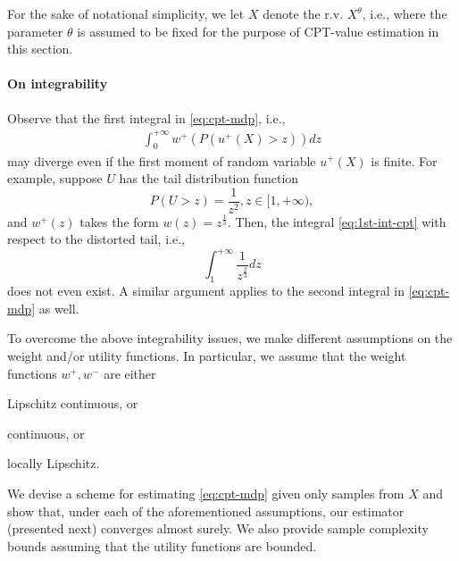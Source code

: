 For the sake of notational simplicity, we let $X$ denote the r.v. $X^\theta$, i.e., where the parameter $\theta$ is assumed to be fixed for the purpose of CPT-value estimation in this section. 

\paragraph{On integrability}
Observe that the first integral in \eqref{eq:cpt-mdp}, i.e., 
\begin{align}
\label{eq:1st-int-cpt}
\int_0^{+\infty} w^+(P(u^+(X)>z)) d z
\end{align}
may diverge even if the first moment of random variable $u^+(X)$ is finite. 
For example, suppose $U$ has the tail distribution function
$$P(U>z)  = \frac{1}{z^2}, z\in [1, +\infty),$$
and $w^+(z)$ takes the form $w(z) = z^{\frac{1}{3}}$. Then, the integral \eqref{eq:1st-int-cpt} with respect to the distorted tail, i.e.,
$$
\int_1^{+\infty} \frac{1}{z^{\frac{2}{3}}} dz
$$
does not even exist. A similar argument applies to the second integral in \eqref{eq:cpt-mdp} as well.

To overcome the above integrability issues, we make different assumptions on the weight and/or utility functions. In particular, we assume that the weight functions $w^+, w^-$ are either 
\begin{inparaenum}[\bfseries (i)]
\item Lipschitz continuous, or
\item \holder continuous, or
\item locally Lipschitz.
\end{inparaenum}
We devise a scheme for estimating \eqref{eq:cpt-mdp} given only samples from $X$ and show that, under each of the aforementioned assumptions, our estimator (presented next) converges almost surely. 
We also provide sample complexity bounds assuming that the utility functions are bounded.

